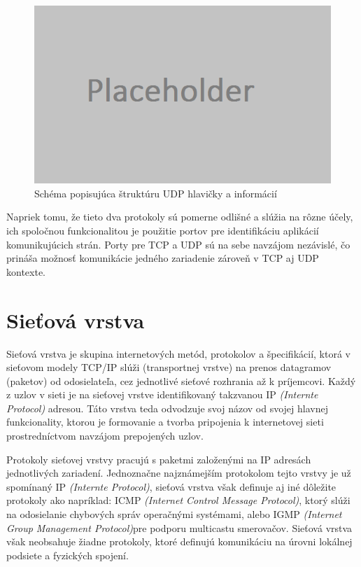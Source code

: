 \documentclass[
  printed, %
  table,   %
  lof,     %
  lot,     %
]{fithesis3}
\begin{document}
\begin{figure}[h]
  \centering
    \includegraphics[width=.80\textwidth]{images/net-udp-head.png}
  \caption{Schéma popisujúca štruktúru UDP hlavičky a informácií}
  \label{fig:net-udp-head}
\end{figure}

Napriek tomu, že tieto dva protokoly sú pomerne odlišné a slúžia na rôzne
účely, ich spoločnou funkcionalitou je použitie portov pre identifikáciu
aplikácií komunikujúcich strán. Porty pre TCP a UDP sú na sebe navzájom
nezávislé, čo prináša možnosť komunikácie jedného zariadenie zároveň v TCP aj
UDP kontexte.

\section{Sieťová vrstva}
Sieťová vrstva je skupina internetových metód, protokolov a špecifikácií, ktorá
v sieťovom modely TCP/IP slúži (transportnej vrstve) na prenos datagramov
(paketov) od odosielateľa, cez jednotlivé sieťové rozhrania až k príjemcovi.
Každý z uzlov v sieti je na sieťovej vrstve identifikovaný takzvanou IP
\textit{(Internte Protocol)} adresou. Táto vrstva teda odvodzuje svoj názov od
svojej hlavnej funkcionality, ktorou je formovanie a tvorba pripojenia k
internetovej sieti prostredníctvom navzájom prepojených uzlov.

Protokoly sieťovej vrstvy pracujú s paketmi založenými na IP adresách
jednotlivých zariadení. Jednoznačne najznámejším protokolom tejto vrstvy je už
spomínaný IP \textit{(Internte Protocol)}, sieťová vrstva však definuje aj iné
dôležite protokoly ako napríklad: ICMP
\textit{(Internet Control Message Protocol)}, ktorý slúži na odosielanie
chybových správ operačnými systémami, alebo IGMP
\textit{(Internet Group Management Protocol)}pre podporu multicastu smerovačov.
Sieťová vrstva však neobsahuje žiadne protokoly, ktoré definujú komunikáciu na
úrovni lokálnej podsiete a fyzických spojení.
\end{document}
